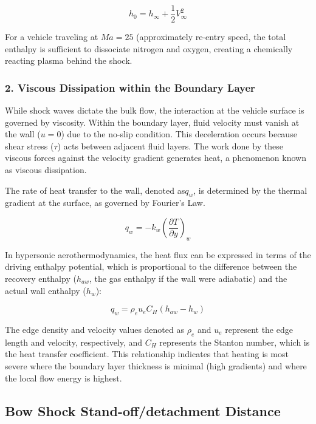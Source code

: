 \begin{equation}
    h_0 = h_{\infty} + \frac{1}{2} V_{\infty}^2
\end{equation}

For a vehicle traveling at $Ma = 25$ (approximately re-entry speed, the total enthalpy is sufficient to dissociate nitrogen and oxygen, creating a chemically reacting plasma behind the shock.

\subsubsection*{2. Viscous Dissipation within the Boundary Layer}
While shock waves dictate the bulk flow, the interaction at the vehicle surface is governed by viscosity. Within the boundary layer, fluid velocity must vanish at the wall ($u=0$) due to the no-slip condition. This deceleration occurs because shear stress ($\tau$) acts between adjacent fluid layers. The work done by these viscous forces against the velocity gradient generates heat, a phenomenon known as viscous dissipation.
\par
The rate of heat transfer to the wall, denoted as$q_w$, is determined by the thermal gradient at the surface, as governed by Fourier's Law.

\begin{equation}
    q_w = -k_w \left( \frac{\partial T}{\partial y} \right)_{w}
\end{equation}

In hypersonic aerothermodynamics, the heat flux can be expressed in terms of the driving enthalpy potential, which is proportional to the difference between the recovery enthalpy ($h_{aw}$, the gas enthalpy if the wall were adiabatic) and the actual wall enthalpy ($h_w$):

\begin{equation}
    q_w = \rho_e u_e C_H (h_{aw} - h_w)
\end{equation}

The edge density and velocity values denoted as $\rho_e$ and $u_e$ represent the edge length and velocity, respectively, and $C_H$ represents the Stanton number, which is the heat transfer coefficient. This relationship indicates that heating is most severe where the boundary layer thickness is minimal (high gradients) and where the local flow energy is highest.

\subsection{Bow Shock Stand-off/detachment Distance}

